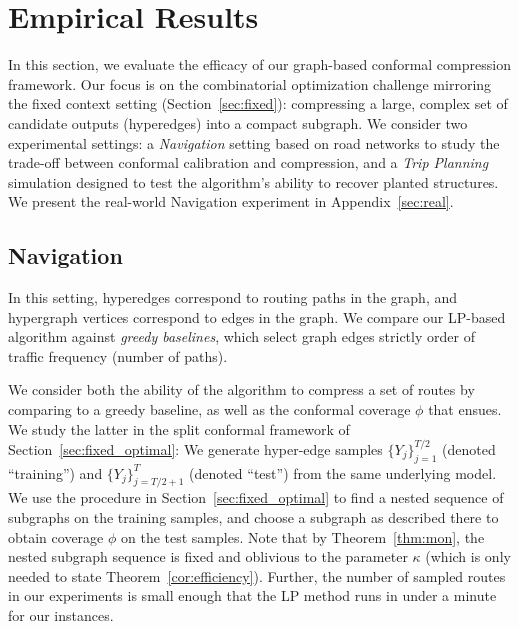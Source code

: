 \section{Empirical Results}
\label{sec:experiments}

In this section, we evaluate the efficacy of our graph-based conformal compression framework. Our focus is on the combinatorial optimization challenge mirroring the fixed context setting (Section~\ref{sec:fixed}): compressing a large, complex set of candidate outputs (hyperedges) into a compact subgraph.    We consider two experimental settings: a  \textit{Navigation} setting based on road networks to study the trade-off between conformal calibration and compression, and a \textit{Trip Planning} simulation designed to test the algorithm's ability to recover planted structures. We present the real-world Navigation experiment in Appendix~\ref{sec:real}.

\subsection{Navigation}
\label{sec:nav_experiments}
In this setting, hyperedges correspond to routing paths in the graph, and hypergraph vertices correspond to edges in the graph.  We compare our LP-based algorithm against {\em greedy baselines}, which select graph edges strictly order of traffic frequency (number of paths). 

We consider both the ability of the algorithm to compress a set of routes by comparing to a greedy baseline, as well as the conformal coverage $\phi$ that ensues. We study the latter in the split conformal framework of Section~\ref{sec:fixed_optimal}: We generate hyper-edge samples $\{Y_j\}_{j=1}^{T/2}$ (denoted ``training'') and $\{Y_j\}_{j=T/2+1}^{T}$ (denoted ``test'')  from the same underlying model. We use the procedure in Section~\ref{sec:fixed_optimal} to find a nested sequence of subgraphs on the training samples, and choose a subgraph as described there to obtain coverage $\phi$ on the test samples. Note that by Theorem~\ref{thm:mon}, the nested subgraph sequence is fixed and oblivious to the parameter $\kappa$ (which is only needed to state Theorem~\ref{cor:efficiency}). Further, the number of sampled routes in our experiments is small enough that the LP method runs in under a minute for our instances. 

